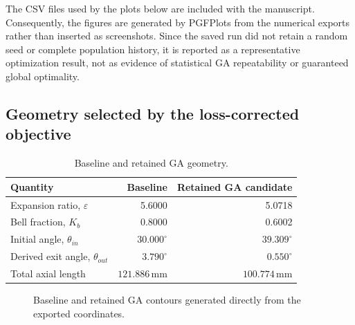 The CSV files used by the plots below are included with the manuscript. Consequently,
the figures are generated by PGFPlots from the numerical exports rather than inserted
as screenshots. Since the saved run did not retain a random seed or complete population
history, it is reported as a representative optimization result, not as evidence of
statistical GA repeatability or guaranteed global optimality.

\subsection{Geometry selected by the loss-corrected objective}

\begin{table}[H]
\centering
\caption{Baseline and retained GA geometry.}
\label{tab:geometry_comparison}
\begin{tabular}{lrr}
\toprule
Quantity & Baseline & Retained GA candidate \\
\midrule
Expansion ratio, \(\varepsilon\) & 5.6000 & 5.0718 \\
Bell fraction, \(K_b\) & 0.8000 & 0.6002 \\
Initial angle, \(\theta_{in}\) & \(30.000^\circ\) & \(39.309^\circ\) \\
Derived exit angle, \(\theta_{out}\) & \(3.790^\circ\) & \(0.550^\circ\) \\
Total axial length & \(121.886\,\mathrm{mm}\) & \(100.774\,\mathrm{mm}\) \\
\bottomrule
\end{tabular}
\end{table}

\begin{figure}[H]
\centering
{}
\caption{Baseline and retained GA contours generated directly from the exported coordinates.}
\label{fig:optimized_geometry_comparison}
\end{figure}


